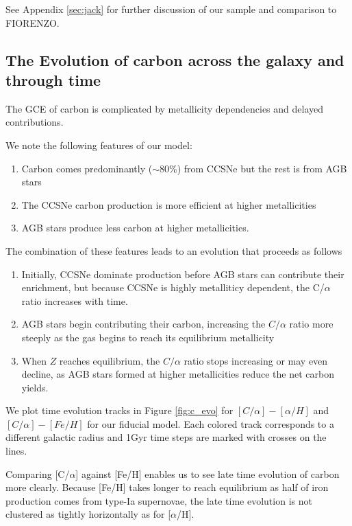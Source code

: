 \documentclass[fleqn,usenatbib]{mnras}
\begin{document}
See Appendix \ref{sec:jack} for further discussion of our sample and comparison to FIORENZO.


\subsection{The Evolution of carbon across the galaxy and through time}

The GCE of carbon is complicated by metallicity dependencies and delayed contributions. 

We note the following features of our model:

\begin{enumerate}
    \item Carbon comes predominantly ($\sim80\%$) from CCSNe but the rest is from AGB stars
    \item The CCSNe carbon production is more efficient at higher metallicities
    \item AGB stars produce less carbon at higher metallicities.
\end{enumerate}


The combination of these features leads to an evolution that proceeds as follows
\begin{enumerate}
    \item Initially, CCSNe dominate production before AGB stars can contribute their enrichment, but because CCSNe is highly metalliticy dependent, the C/$\alpha$ ratio increases with time.
    \item AGB stars begin contributing their carbon, increasing the $C/\alpha$ ratio more steeply as the gas begins to reach its equilibrium metallicity
    \item When $Z$ reaches equilibrium, the $C/\alpha$ ratio stops increasing or may even decline, as AGB stars formed at higher metallicities reduce the net carbon yields.
\end{enumerate}

We plot time evolution tracks in Figure \ref{fig:c_evo} for $[C/\alpha]-[\alpha/H]$ and $[C/\alpha]-[Fe/H]$ for our fiducial model. Each colored track corresponds to a different galactic radius and 1Gyr time steps are marked with crosses on the lines. 

Comparing [C/$\alpha$] against [Fe/H] enables us to see late time evolution of carbon more clearly. Because [Fe/H] takes longer to reach equilibrium as half of iron production comes from type-Ia supernovae, the late time evolution is not clustered as tightly horizontally as for [$\alpha$/H].
\end{document}

